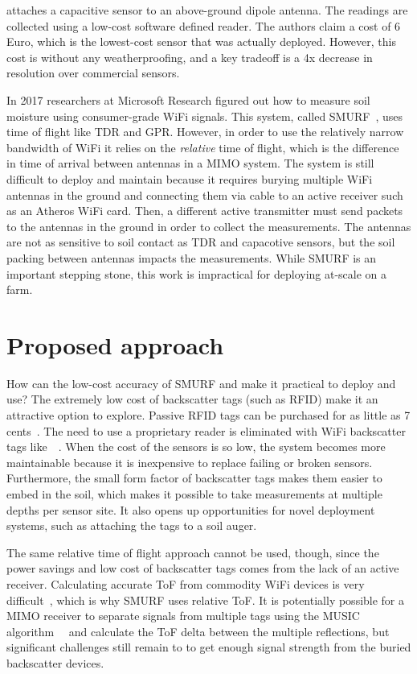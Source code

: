 \documentclass[12pt]{article}
\begin{document}
\cite{Daskalakis2016} attaches a capacitive sensor to an above-ground dipole
antenna. The readings are collected using a low-cost software defined
reader. The authors claim a cost of 6 Euro, which is the lowest-cost
sensor that was actually deployed. However, this cost is without any
weatherproofing, and a key tradeoff is a 4x decrease in resolution
over commercial sensors.


In 2017 researchers at Microsoft Research figured out how to measure
soil moisture using consumer-grade WiFi signals. This system, called
SMURF~\cite{smurf}, uses time of flight like TDR and GPR. However, in
order to use the relatively narrow bandwidth of WiFi it relies on the
\emph{relative} time of flight, which is the difference in time of
arrival between antennas in a MIMO system. The system is still
difficult to deploy and maintain because it requires burying multiple
WiFi antennas in the ground and connecting them via cable to an active
receiver such as an Atheros WiFi card. Then, a different active
transmitter must send packets to the antennas in the ground in order
to collect the measurements. The antennas are not as sensitive to soil
contact as TDR and capacotive sensors, but the soil packing between
antennas impacts the measurements. While SMURF is an important
stepping stone, this work is impractical for deploying at-scale on a
farm.

\section*{Proposed approach}
How can the low-cost accuracy of SMURF and make it practical to deploy
and use? The extremely low cost of backscatter tags (such as RFID) make
it an attractive option to explore. Passive RFID tags can be purchased
for as little as 7 cents~\cite{rfidcost}. The need to use a
proprietary reader is eliminated with WiFi backscatter tags
like~\cite{Zhang2017}~\cite{Zhang2016}. When the cost of the sensors
is so low, the system becomes more maintainable because it is
inexpensive to replace failing or broken sensors. Furthermore, the
small form factor of backscatter tags makes them easier to embed in
the soil, which makes it possible to take measurements at multiple
depths per sensor site. It also opens up opportunities for novel
deployment systems, such as attaching the tags to a soil auger.

The same relative time of flight approach cannot be used, though,
since the power savings and low cost of backscatter tags comes from
the lack of an active receiver. Calculating accurate ToF from
commodity WiFi devices is very difficult~\cite{Vasisht2015}, which is
why SMURF uses relative ToF. It is potentially possible for a MIMO
receiver to separate signals from multiple tags using the MUSIC
algorithm~\cite{Soltanaghaei2018}~\cite{Kotaru2015} and calculate the
ToF delta between the multiple reflections, but significant challenges
still remain to to get enough signal strength from the buried
backscatter devices.
\end{document}
